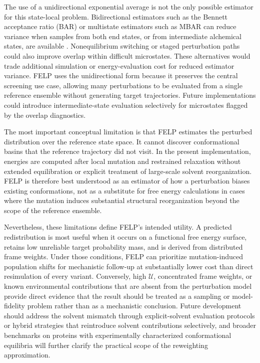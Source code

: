 \documentclass[journal=jctcce,manuscript=article,layout=twocolumn,hyperref=true]{achemso}
\begin{document}
	The use of a unidirectional exponential average is not the only possible estimator for this state-local problem. Bidirectional estimators such as the Bennett acceptance ratio (BAR) or multistate estimators such as MBAR can reduce variance when samples from both end states, or from intermediate alchemical states, are available \cite{shirts2005comparison,shirts2008mbar}. Nonequilibrium switching or staged perturbation paths could also improve overlap within difficult microstates. These alternatives would trade additional simulation or energy-evaluation cost for reduced estimator variance. FELP uses the unidirectional form because it preserves the central screening use case, allowing many perturbations to be evaluated from a single reference ensemble without generating target trajectories. Future implementations could introduce intermediate-state evaluation selectively for microstates flagged by the overlap diagnostics.
	
	The most important conceptual limitation is that FELP estimates the perturbed distribution over the reference state space. It cannot discover conformational basins that the reference trajectory did not visit. In the present implementation, energies are computed after local mutation and restrained relaxation without extended equilibration or explicit treatment of large-scale solvent reorganization. FELP is therefore best understood as an estimator of how a perturbation biases existing conformations, not as a substitute for free energy calculations in cases where the mutation induces substantial structural reorganization beyond the scope of the reference ensemble.
	
	Nevertheless, these limitations define FELP's intended utility. A predicted redistribution is most useful when it occurs on a functional free energy surface, retains low unreliable target probability mass, and is derived from distributed frame weights. Under those conditions, FELP can prioritize mutation-induced population shifts for mechanistic follow-up at substantially lower cost than direct resimulation of every variant. Conversely, high $\mathcal{U}$, concentrated frame weights, or known environmental contributions that are absent from the perturbation model provide direct evidence that the result should be treated as a sampling or model-fidelity problem rather than as a mechanistic conclusion. Future development should address the solvent mismatch through explicit-solvent evaluation protocols or hybrid strategies that reintroduce solvent contributions selectively, and broader benchmarks on proteins with experimentally characterized conformational equilibria will further clarify the practical scope of the reweighting approximation.
	
\end{document}
